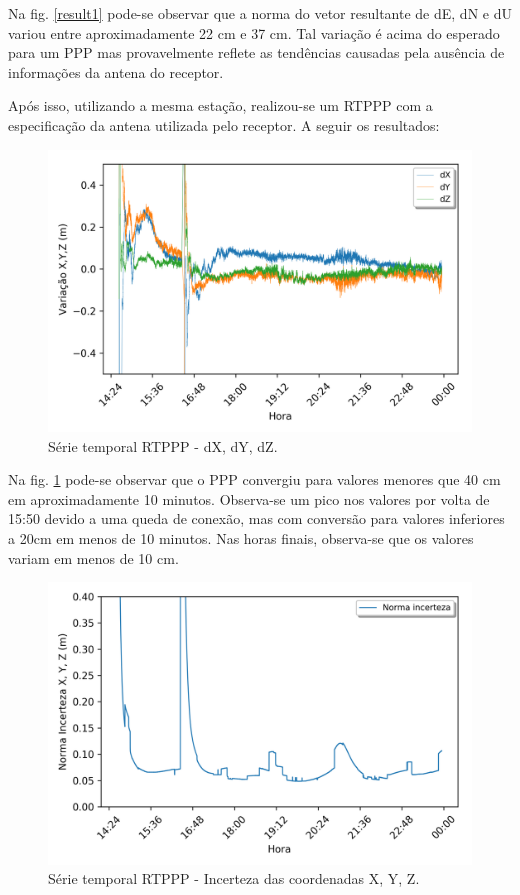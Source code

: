 Na fig. \ref{result1} pode-se observar que a norma do vetor resultante de dE, dN e dU variou entre aproximadamente 22 cm e 37 cm. Tal variação é acima do esperado para um PPP mas provavelmente reflete as tendências causadas pela ausência de informações da antena do receptor.

Após isso, utilizando a mesma estação, realizou-se um RTPPP com a especificação da antena utilizada pelo receptor. A seguir os resultados:

\begin{figure}[H]
\centering
\includegraphics[scale=0.9]{data/Graphics/POAL20650/POAL20650_graphic_xyz.png}
\caption{Série temporal RTPPP - dX, dY, dZ.}
\label{rtppp2}
\end{figure}

Na fig. \ref{rtppp2} pode-se observar que o PPP convergiu para valores menores que 40 cm em aproximadamente 10 minutos. Observa-se um pico nos valores por volta de 15:50 devido a uma queda de conexão, mas com conversão para valores inferiores a 20cm em menos de 10 minutos. Nas horas finais, observa-se que os valores variam em menos de 10 cm.

\begin{figure}[H]
\centering
\includegraphics[scale=0.9]{data/Graphics/POAL20650/POAL20650_graphic_uncertainty.png}
\caption{Série temporal RTPPP - Incerteza das coordenadas X, Y, Z.}
\label{incert2}
\end{figure}

